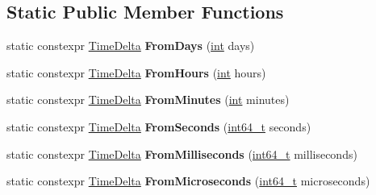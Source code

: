 \subsection*{Static Public Member Functions}
\begin{DoxyCompactItemize}
\item 
\mbox{\label{classv8_1_1base_1_1TimeDelta_a619d8d037c1b49bdf59d1fb05fa095f4}} 
static constexpr \mbox{\hyperlink{classv8_1_1base_1_1TimeDelta}{Time\+Delta}} {\bfseries From\+Days} (\mbox{\hyperlink{classint}{int}} days)
\item 
\mbox{\label{classv8_1_1base_1_1TimeDelta_a5e29e609e85ca493582b114fc0c69d39}} 
static constexpr \mbox{\hyperlink{classv8_1_1base_1_1TimeDelta}{Time\+Delta}} {\bfseries From\+Hours} (\mbox{\hyperlink{classint}{int}} hours)
\item 
\mbox{\label{classv8_1_1base_1_1TimeDelta_a0da7ea02c3bcbb0875c1354246d54469}} 
static constexpr \mbox{\hyperlink{classv8_1_1base_1_1TimeDelta}{Time\+Delta}} {\bfseries From\+Minutes} (\mbox{\hyperlink{classint}{int}} minutes)
\item 
\mbox{\label{classv8_1_1base_1_1TimeDelta_a38d36ea798323760ea45d69bb3b8b6e6}} 
static constexpr \mbox{\hyperlink{classv8_1_1base_1_1TimeDelta}{Time\+Delta}} {\bfseries From\+Seconds} (\mbox{\hyperlink{classint64__t}{int64\+\_\+t}} seconds)
\item 
\mbox{\label{classv8_1_1base_1_1TimeDelta_aedb23f3b7d15531e09b71883aaa96b6d}} 
static constexpr \mbox{\hyperlink{classv8_1_1base_1_1TimeDelta}{Time\+Delta}} {\bfseries From\+Milliseconds} (\mbox{\hyperlink{classint64__t}{int64\+\_\+t}} milliseconds)
\item 
\mbox{\label{classv8_1_1base_1_1TimeDelta_a1df269c42efa26b4b6defb9d83f850da}} 
static constexpr \mbox{\hyperlink{classv8_1_1base_1_1TimeDelta}{Time\+Delta}} {\bfseries From\+Microseconds} (\mbox{\hyperlink{classint64__t}{int64\+\_\+t}} microseconds)
\item 
\mbox{\label{classv8_1_1base_1_1TimeDelta_a023a048044be14caae6555c3f1763b9e}} 

\end{DoxyCompactItemize}
